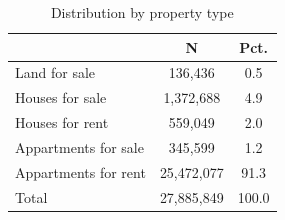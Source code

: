 \begin{table}[htbp]\centering
\def\sym#1{\ifmmode^{#1}\else\(^{#1}\)\fi}
\caption{Distribution by property type}
\begin{tabular}{l*{1}{cc}}
\toprule
            &           N&        Pct.\\
\midrule
Land for sale&     136,436&         0.5\\
Houses for sale&   1,372,688&         4.9\\
Houses for rent&     559,049&         2.0\\
Appartments for sale&     345,599&         1.2\\
Appartments for rent&  25,472,077&        91.3\\
Total       &  27,885,849&       100.0\\
\bottomrule
\end{tabular}
\end{table}
